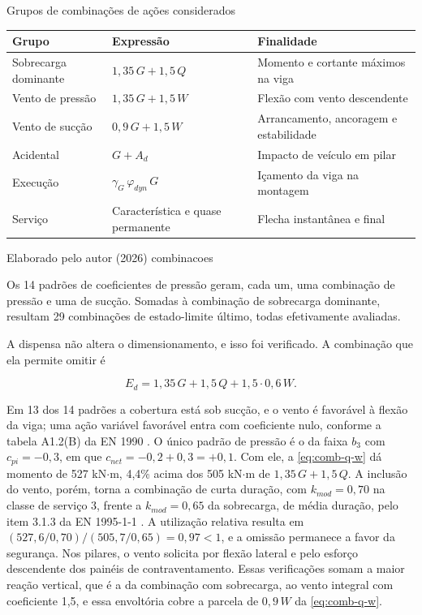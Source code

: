 \tabela
{Grupos de combinações de ações considerados}
{\footnotesize
\begin{tabular}{llp{4.9cm}}
\toprule
    \textbf{Grupo} & \textbf{Expressão} & \textbf{Finalidade} \\
\midrule
    Sobrecarga dominante & $1{,}35\,G + 1{,}5\,Q$ & Momento e cortante máximos na viga \\
    Vento de pressão     & $1{,}35\,G + 1{,}5\,W$ & Flexão com vento descendente \\
    Vento de sucção      & $0{,}9\,G + 1{,}5\,W$  & Arrancamento, ancoragem e estabilidade \\
    Acidental            & $G + A_d$          & Impacto de veículo em pilar \\
    Execução             & $\gamma_G\,\varphi_{dyn}\,G$ & Içamento da viga na montagem \\
    Serviço              & Característica e quase permanente & Flecha instantânea e final \\
\bottomrule
\end{tabular}}
{Elaborado pelo autor (2026)}
{combinacoes}
{}
{}

Os 14 padrões de coeficientes de pressão geram, cada um, uma combinação de
pressão e uma de sucção. Somadas à combinação de sobrecarga dominante, resultam
29 combinações de estado-limite último, todas efetivamente avaliadas.

A dispensa não altera o dimensionamento, e isso foi verificado. A combinação que
ela permite omitir é

\begin{equation}
    E_d = 1{,}35\,G + 1{,}5\,Q + 1{,}5 \cdot 0{,}6\,W . \label{eq:comb-q-w}
\end{equation}

\noindent
Em 13 dos 14 padrões a cobertura está sob sucção, e o vento é
favorável à flexão da viga; uma ação variável favorável entra com coeficiente
nulo, conforme a tabela A1.2(B) da EN 1990 \cite{EN1990:2002}. O único padrão de
pressão é o da faixa $b_3$ com $c_{pi} = -0{,}3$, em que
$c_{net} = -0{,}2 + 0{,}3 = +0{,}1$. Com ele, a \autoref{eq:comb-q-w} dá momento de
527 kN$\cdot$m, 4,4\% acima dos 505 kN$\cdot$m de $1{,}35\,G + 1{,}5\,Q$. A
inclusão do vento, porém, torna a combinação de curta duração, com
$k_{mod} = 0{,}70$ na classe de serviço 3, frente a $k_{mod} = 0{,}65$ da sobrecarga,
de média duração, pelo item 3.1.3 da EN 1995-1-1 \cite{EN1995-1-1:2004}. A
utilização relativa resulta em
$(527{,}6/0{,}70)/(505{,}7/0{,}65) = 0{,}97 < 1$, e a omissão permanece a favor da
segurança.
Nos pilares, o vento solicita por flexão lateral e pelo esforço descendente dos
painéis de contraventamento. Essas verificações somam a maior reação vertical,
que é a da combinação com sobrecarga, ao vento integral com coeficiente 1,5, e
essa envoltória cobre a parcela de $0{,}9\,W$ da \autoref{eq:comb-q-w}.

